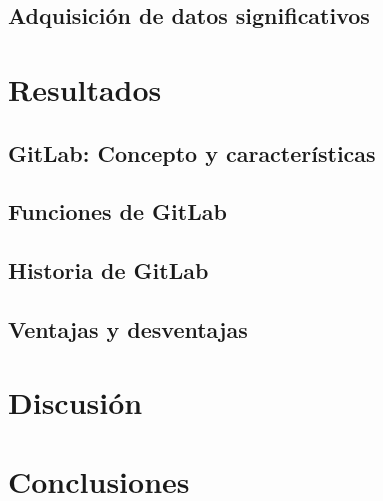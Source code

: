 \documentclass[runningheads]{llncs}
\begin{document}
\subsection{Adquisición de datos significativos}
\section{Resultados}
\subsection{GitLab: Concepto y características}
\subsection{Funciones de GitLab}
\subsection{Historia de GitLab}
\subsection{Ventajas y desventajas}
\section{Discusión}
\section{Conclusiones}


\end{document}
